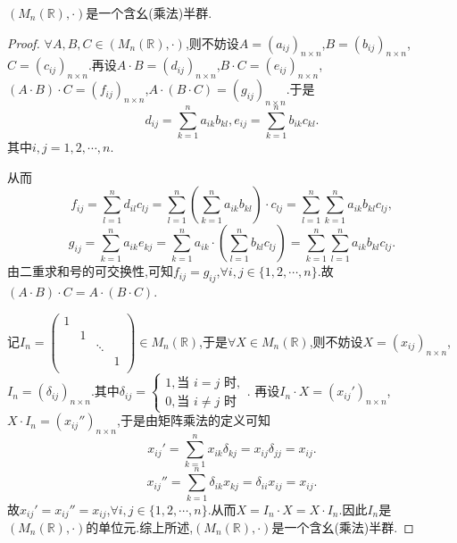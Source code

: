 \documentclass[lang=cn,newtx,10pt,scheme=chinese]{elegantbook}
\begin{document}
\begin{example}
$\left( M_n\left( \mathbb{R} \right) ,\cdot \right)$是一个含幺(乘法)半群.
\end{example}
\begin{proof}
\(\forall A,B,C\in (M_n(\mathbb{R}),\cdot)\),则不妨设\(A=(a_{ij})_{n\times n}\),\(B=(b_{ij})_{n\times n}\),\(C=(c_{ij})_{n\times n}\).再设\(A\cdot B=(d_{ij})_{n\times n}\),\(B\cdot C=(e_{ij})_{n\times n}\),\((A\cdot B)\cdot C=(f_{ij})_{n\times n}\),\(A\cdot (B\cdot C)=(g_{ij})_{n\times n}\).于是
\[
d_{ij}=\sum_{k = 1}^n{a_{ik}b_{kl}},e_{ij}=\sum_{k = 1}^n{b_{ik}c_{kl}}.
\]
其中\(i,j = 1,2,\cdots,n\).

从而
\[
f_{ij}=\sum_{l = 1}^n{d_{il}c_{lj}}=\sum_{l = 1}^n{\left(\sum_{k = 1}^n{a_{ik}b_{kl}}\right)\cdot c_{lj}}=\sum_{l = 1}^n{\sum_{k = 1}^n{a_{ik}b_{kl}c_{lj}}},
\]
\[
g_{ij}=\sum_{k = 1}^n{a_{ik}e_{kj}}=\sum_{k = 1}^n{a_{ik}\cdot\left(\sum_{l = 1}^n{b_{kl}c_{lj}}\right)}=\sum_{k = 1}^n{\sum_{l = 1}^n{a_{ik}b_{kl}c_{lj}}}.
\]
由二重求和号的可交换性,可知\(f_{ij}=g_{ij}\),\(\forall i,j\in \{1,2,\cdots,n\}\).故\((A\cdot B)\cdot C = A\cdot (B\cdot C)\).

记\(I_n=\begin{pmatrix}
    1 & & & \\
    & 1 & & \\
    & & \ddots & \\
    & & & 1\\
    \end{pmatrix}\in M_n(\mathbb{R})\),于是\(\forall X\in M_n(\mathbb{R})\),则不妨设\(X=(x_{ij})_{n\times n}\),\(I_n = (\delta_{ij})_{n\times n}\).其中\(\delta_{ij}=\begin{cases}
    1,\text{当 }i = j\text{ 时},\\
    0,\text{当 }i\neq j\text{ 时}
    \end{cases}\).
    再设\(I_n\cdot X=(x_{ij}')_{n\times n}\),\(X\cdot I_n=(x_{ij}'')_{n\times n}\),于是由矩阵乘法的定义可知
    \[
    x_{ij}'=\sum_{k = 1}^n{x_{ik}\delta_{kj}}=x_{ij}\delta_{jj}=x_{ij}.
    \]
    \[
    x_{ij}''=\sum_{k = 1}^n{\delta_{ik}x_{kj}}=\delta_{ii}x_{ij}=x_{ij}.
    \]
    故\(x_{ij}'=x_{ij}''=x_{ij}\),\(\forall i,j\in \{1,2,\cdots,n\}\).从而\(X = I_n\cdot X = X\cdot I_n\).因此\(I_n\)是\((M_n(\mathbb{R}),\cdot)\)的单位元.综上所述,$\left( M_n\left( \mathbb{R} \right) ,\cdot \right)$是一个含幺(乘法)半群.
\end{proof}


\begin{definition}
    
\end{definition}
\end{document}
